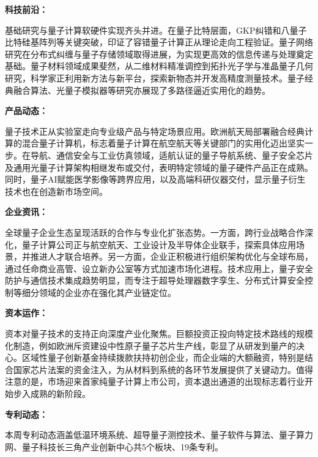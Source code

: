 \documentclass[12pt,a4paper]{ctexart}
\begin{document}
\textbf{ 科技前沿：}

基础研究与量子计算软硬件实现齐头并进。在量子比特层面，GKP纠错和八量子比特硅基阵列等关键突破，印证了容错量子计算正从理论走向工程验证。量子网络研究在分布式纠缠与量子存储领域取得进展，为实现更高效的信息传递与处理奠定基础。量子材料领域成果斐然，从二维材料精准调控到拓扑光子学与准晶量子几何研究，科学家正利用新方法与新平台，探索新物态并开发高精度测量技术。量子经典融合算法、光量子模拟器等研究亦展现了多路径逼近实用化的趋势。


\textbf{ 产品动态：}

量子技术正从实验室走向专业级产品与特定场景应用。欧洲航天局部署融合经典计算的混合量子计算机，标志着量子计算在航空航天等关键部门的实用化迈出坚实一步。在导航、通信安全与工业仿真领域，适航认证的量子导航系统、量子安全芯片及通用光量子计算架构相继发布或交付，表明特定领域的量子硬件产品正在成熟。同时，量子AI赋能医学影像等跨界应用，以及高端科研仪器交付，显示量子衍生技术也在创造新市场空间。


\textbf{ 企业资讯：}

全球量子企业生态呈现活跃的合作与专业化扩张态势。一方面，跨行业战略合作深化，量子计算公司正与航空航天、工业设计及半导体企业联手，探索具体应用场景，并推进人才联合培养。另一方面，企业正积极进行组织架构优化与全球布局，通过任命商业高管、设立新办公室等方式加速市场化进程。技术应用上，量子安全防护与通信技术集成趋势明显，而专注于超导处理器数字孪生、分布式计算安全控制等细分领域的企业亦在强化其产业链定位。


\textbf{ 资本运作：}

资本对量子技术的支持正向深度产业化聚焦。巨额投资正投向特定技术路线的规模化制造，例如欧洲斥资建设中性原子量子芯片生产线，彰显了从研发到量产的决心。区域性量子创新基金持续拨款扶持初创企业，而企业端的大额融资，特别是结合国家芯片法案的资金注入，为从材料到系统的各环节发展提供了关键动力。值得注意的是，市场迎来首家纯量子计算上市公司，资本退出通道的出现标志着行业开始步入成熟的新阶段。




\textbf{ 专利动态：}

本周专利动态涵盖低温环境系统、超导量子测控技术、量子软件与算法、量子算力网、量子科技长三角产业创新中心共5个板块、19条专利。
\end{document}
